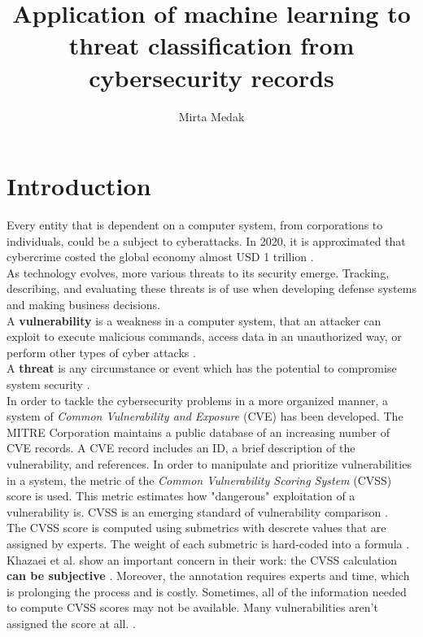 \documentclass[times, utf8, zavrsni, english]{fer}
\begin{document}

\title{Application of machine learning to threat classification from cybersecurity records}

\author{Mirta Medak}

\maketitle

\izvornik

\zahvala{}

\tableofcontents

\chapter{Introduction}
Every entity that is dependent on a computer system, from corporations to individuals, could be a subject to cyberattacks. In 2020, it is approximated that cybercrime costed the global economy almost USD 1 trillion \citep{cremer}. \\
As technology evolves, more various threats to its security emerge.
Tracking, describing, and evaluating these threats is of use when developing defense systems and making business decisions. \\
A \textbf{vulnerability} is a weakness in a computer system, that an attacker can exploit to execute malicious commands, access data in an unauthorized way, or perform other types of cyber attacks \citep{humayun}. \\
A \textbf{threat} is any circumstance or event which has the potential to compromise system security \citep{FER}. \\
In order to tackle the cybersecurity problems in a more organized manner, a system of \emph{Common Vulnerability and Exposure} (CVE) has been developed. The MITRE Corporation maintains a public database of an increasing number of CVE records.
A CVE record includes an ID, a brief description of the vulnerability, and references.
In order to manipulate and prioritize vulnerabilities in a system, the metric of the \emph{Common Vulnerability Scoring System} (CVSS) score is used. This metric estimates how "dangerous" exploitation of a vulnerability is. CVSS is an emerging standard of vulnerability comparison \citep{khazaei}. \\
The CVSS score is computed using submetrics with descrete values that are assigned by experts. The weight of each submetric is hard-coded into a formula \citep{bozorgi}. Khazaei et al. show an important concern in their work: the CVSS calculation \textbf{can be subjective} \citep{khazaei}.
Moreover, the annotation requires experts and time, which is prolonging the process and is costly.
Sometimes, all of the information needed to compute CVSS scores may not be available. Many vulnerabilities aren't assigned the score at all. \citep{vulnerwatch}.\\
\end{document}
